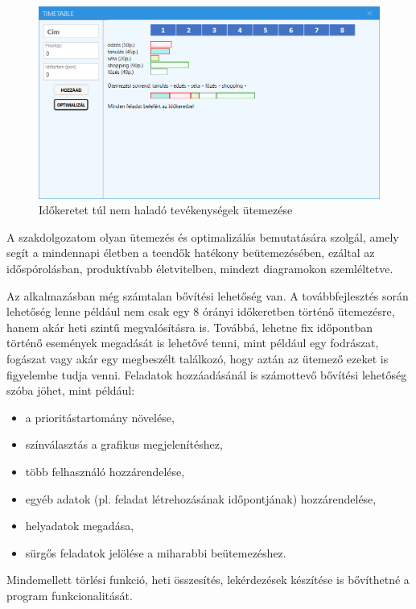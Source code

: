 \begin{figure}[h]
	\centering
	\includegraphics[width=\textwidth]{images/test/result2.png}
	\caption{Időkeretet túl nem haladó tevékenységek ütemezése}
	\label{fig:result2}
\end{figure}


A szakdolgozatom olyan ütemezés és optimalizálás bemutatására szolgál, amely segít a mindennapi életben a teendők hatékony beütemezésében, ezáltal az időspórolásban, produktívabb életvitelben, mindezt diagramokon szemléltetve.

Az alkalmazásban még számtalan bővítési lehetőség van.
A továbbfejlesztés során lehetőség lenne például nem csak egy 8 órányi időkeretben történő ütemezésre, hanem akár heti szintű megvalósításra is. Továbbá, lehetne fix időpontban történő események megadását is lehetővé tenni, mint például egy fodrászat, fogászat vagy akár egy megbeszélt találkozó, hogy aztán az ütemező ezeket is figyelembe tudja venni.
Feladatok hozzáadásánál is számottevő bővítési lehetőség szóba jöhet, mint például:
\begin{itemize}
\item a prioritástartomány növelése,
\item színválasztás a grafikus megjelenítéshez,
\item több felhasználó hozzárendelése,
\item egyéb adatok (pl. feladat létrehozásának időpontjának) hozzárendelése,
\item helyadatok megadása,
\item sürgős feladatok jelölése a miharabbi beütemezéshez.
\end{itemize}
Mindemellett törlési funkció, heti összesítés, lekérdezések készítése is bővíthetné a program funkcionalitását.
